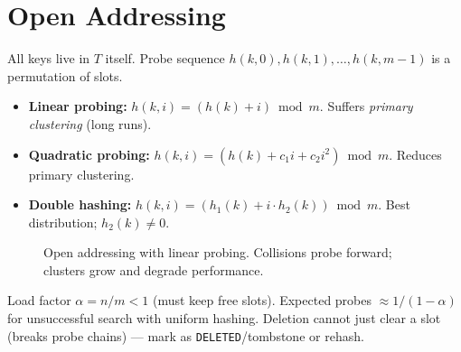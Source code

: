 \section{Open Addressing}
\label{sec:open-addressing}
All keys live in $T$ itself. Probe sequence $h(k,0),h(k,1),\ldots,h(k,m-1)$ is a permutation of slots.

\begin{itemize}
    \item \textbf{Linear probing:} $h(k,i)=(h(k)+i)\bmod m$. Suffers \emph{primary clustering} (long runs).
    \item \textbf{Quadratic probing:} $h(k,i)=(h(k)+c_{1}i+c_{2}i^{2})\bmod m$. Reduces primary clustering.
    \item \textbf{Double hashing:} $h(k,i)=(h_{1}(k)+i\cdot h_{2}(k))\bmod m$. Best distribution; $h_{2}(k)\neq0$.
\end{itemize}

\begin{figure}[h]
\centering
{}
\caption{Open addressing with linear probing. Collisions probe forward; clusters grow and degrade performance.}
\label{fig:open-addressing}
\end{figure}

Load factor $\alpha=n/m<1$ (must keep free slots). Expected probes $\approx1/(1-\alpha)$ for unsuccessful search with uniform hashing. Deletion cannot just clear a slot (breaks probe chains) --- mark as \texttt{DELETED}/tombstone or rehash.

